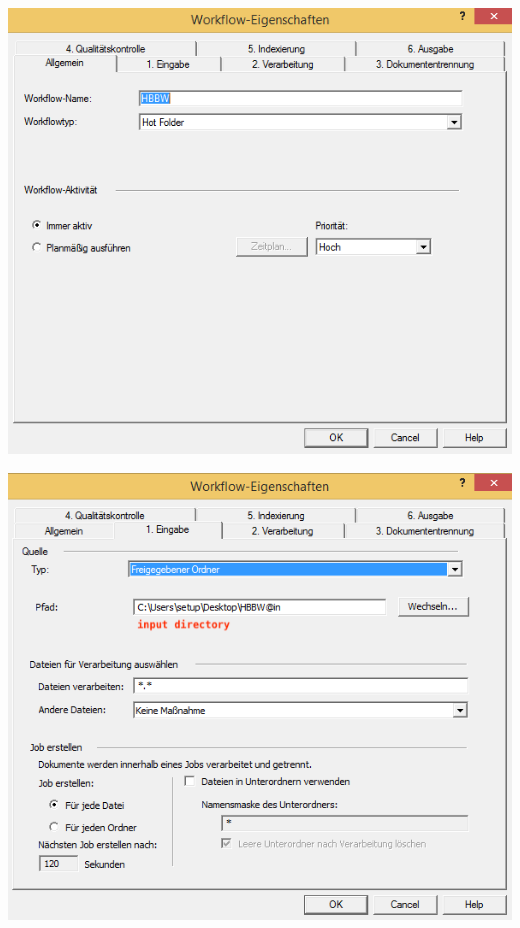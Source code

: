 \begin{minipage}{0.4\textwidth} 
\begin{center}
\includegraphics[scale=0.42]{0_allgemein.png}
\end{center}
\end{minipage}
\begin{minipage}{0.4\textwidth}
\begin{center}
\includegraphics[scale=0.42]{1_eingabe.png}
\end{center}
\end{minipage}


